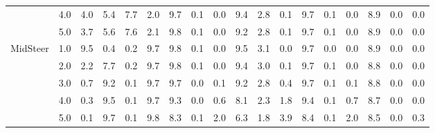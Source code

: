 \begin{table}
{\begin{tabular}{lc|cc|cc|ccc|ccc|ccc|ccc}
 & 4.0 & 4.0 & 5.4 & 7.7 & 2.0 & 9.7 & 0.1 & 0.0 & 9.4 & 2.8 & 0.1 & 9.7 & 0.1 & 0.0 & 8.9 & 0.0 & 0.0 \\
 & 5.0 & 3.7 & 5.6 & 7.6 & 2.1 & 9.8 & 0.1 & 0.0 & 9.2 & 2.8 & 0.1 & 9.7 & 0.1 & 0.0 & 8.9 & 0.0 & 0.0 \\
\cline{1-18}
\multirow{5}{*}{MidSteer} & 1.0 & 9.5 & 0.4 & 0.2 & 9.7 & 9.8 & 0.1 & 0.0 & 9.5 & 3.1 & 0.0 & 9.7 & 0.0 & 0.0 & 8.9 & 0.0 & 0.0 \\
 & 2.0 & 2.2 & 7.7 & 0.2 & 9.7 & 9.8 & 0.1 & 0.0 & 9.4 & 3.0 & 0.1 & 9.7 & 0.1 & 0.0 & 8.8 & 0.0 & 0.0 \\
 & 3.0 & 0.7 & 9.2 & 0.1 & 9.7 & 9.7 & 0.0 & 0.1 & 9.2 & 2.8 & 0.4 & 9.7 & 0.1 & 0.1 & 8.8 & 0.0 & 0.0 \\
 & 4.0 & 0.3 & 9.5 & 0.1 & 9.7 & 9.3 & 0.0 & 0.6 & 8.1 & 2.3 & 1.8 & 9.4 & 0.1 & 0.7 & 8.7 & 0.0 & 0.0 \\
 & 5.0 & 0.1 & 9.7 & 0.1 & 9.8 & 8.3 & 0.1 & 2.0 & 6.3 & 1.8 & 3.9 & 8.4 & 0.1 & 2.0 & 8.5 & 0.0 & 0.3 \\
\bottomrule
\end{tabular}}
\end{table}

